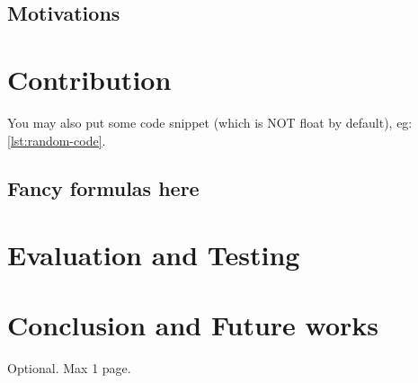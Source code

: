 \documentclass[12pt,a4paper,openright,twoside]{book}
\begin{document}
\section{Motivations}


\chapter{Contribution}
\label{chap:contribution}

You may also put some code snippet (which is NOT float by default), eg: \cref{lst:random-code}.



\section{Fancy formulas here}

\chapter{Evaluation and Testing}
\label{chap:evaluation}

\chapter{Conclusion and Future works}
\label{chap:conclusion}


\backmatter

\nocite{*} %




\begin{acknowledgements} %
Optional. Max 1 page.
\end{acknowledgements}
\end{document}
